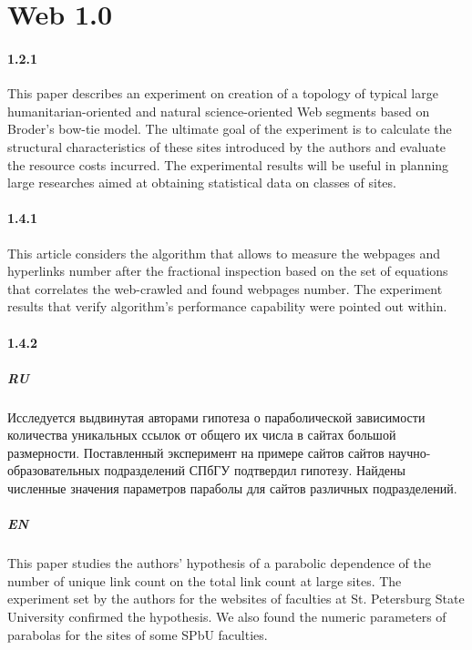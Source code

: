 \chapter{Web 1.0}\label{ch:ch1}

\subsubsection{1.2.1}

This paper describes an experiment on creation of a topology of typical large humanitarian-oriented and natural science-oriented Web segments based on Broder’s bow-tie model. The ultimate goal of the experiment is to calculate the structural characteristics of these sites introduced by the authors and evaluate the resource costs incurred. The experimental results will be useful in planning large researches aimed at obtaining statistical data on classes of sites.

\subsubsection{1.4.1}

This article considers the algorithm that allows to measure the webpages and hyperlinks number after the fractional inspection based on the set of equations that correlates the web-crawled and found webpages number. The experiment results that verify algorithm’s performance capability were pointed out within.

\subsubsection{1.4.2}

\paragraph{RU} Исследуется выдвинутая авторами гипотеза о параболической зависимости количества уникальных ссылок от общего их числа в сайтах большой размерности. Поставленный эксперимент на примере сайтов сайтов научно-образовательных подразделений СПбГУ подтвердил гипотезу. Найдены численные значения параметров параболы для сайтов различных подразделений.

\paragraph{EN} This paper studies the authors' hypothesis of a parabolic dependence of the number of unique link count on the total link count at large sites. The experiment set by the authors for the websites of faculties at St. Petersburg State University confirmed the hypothesis. We also found the numeric parameters of parabolas for the sites of some SPbU faculties.

